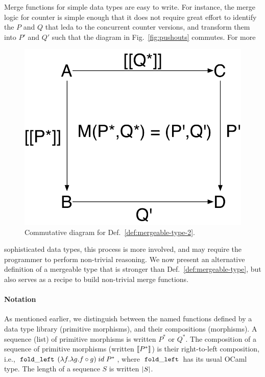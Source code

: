 
Merge functions for simple data types are easy to write. For instance,
the merge logic for counter is simple enough that it does not require
great effort to identify the $P$ and $Q$ that leda to the
concurrent counter versions, and transform them into $P'$ and $Q'$
such that the diagram in Fig.~\ref{fig:pushouts} commutes. For more
\begin{figure}
\centering
\includegraphics[scale=0.35]{Figures/pushouts-2}
\caption{Commutative diagram for Def.~\ref{def:mergeable-type-2}.}
\label{fig:pushouts-2}
\end{figure}
sophisticated data types, this process is more involved, and may require
the programmer to perform non-trivial reasoning. We now present an
alternative definition of a mergeable type that is stronger than
Def.~\ref{def:mergeable-type}, but also serves as a recipe to build
non-trivial merge functions.

\paragraph{Notation} As mentioned earlier, we distinguish between the
named functions defined by a data type library (primitive morphisms),
and their compositions (morphisms). A sequence (list) of primitive
morphisms is written $P^*$ or $Q^*$. The composition of a sequence of
primitive morphisms (written $\llbracket P^* \rrbracket$) is their right-to-left
composition, i.e., $\,{\tt fold\_left}\,\;(\lambda f.\lambda g. f \circ
g)\; id\; P^*$, where $\,{\tt fold\_left}\,$ has its usual OCaml type. The
length of a sequence $S$ is written $\left|S\right|$.

